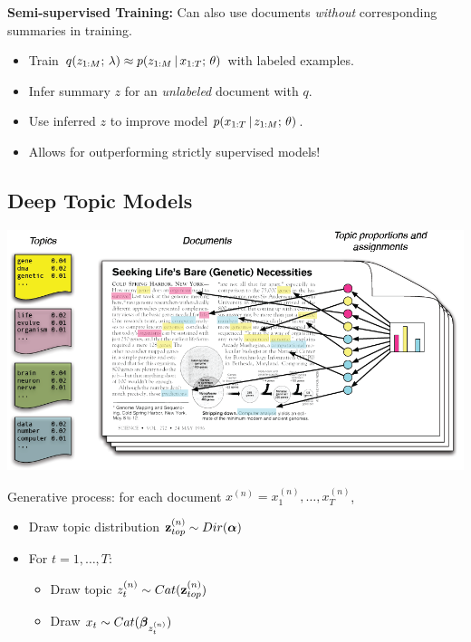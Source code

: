 \begin{frame}
\textbf{Semi-supervised Training:} Can also use documents \textit{without} corresponding summaries in training.
\begin{itemize}
    \item Train $q(z_{1:M} ; \, \lambda) \approx p(z_{1:M} \,|\, x_{1:T} ; \, \theta)$ with labeled examples.
    \air
    \item Infer summary $z$ for an \textit{unlabeled} document with $q$.
    \air
    \item Use inferred $z$ to improve model $p(x_{1:T} \,|\, z_{1:M} ; \, \theta)$.
    \air
    \item Allows for outperforming strictly supervised models!
\end{itemize}
\end{frame}

\subsection{Deep Topic Models}

\begin{frame}

\begin{center}
\includegraphics[scale=0.27]{pics/IntroToLDA.png}
\end{center}

Generative process: for each document $x^{(n)} = x^{(n)}_1, \ldots, x^{(n)}_T$,

\vspace{-2mm}
\begin{itemize}
    \item  Draw topic distribution $\mathbf{z}^{(n)}_{top} \sim Dir(\boldsymbol{\alpha})$
    \item  For $t=1, \ldots, T$:
    \begin{itemize}
        \item Draw topic $z^{(n)}_t \sim Cat(\mathbf{z}^{(n)}_{top})$
        \item Draw $x_t \sim Cat(\boldsymbol{\beta}_{z^{(n)}_t})$
    \end{itemize}
\end{itemize}
    
\end{frame}

